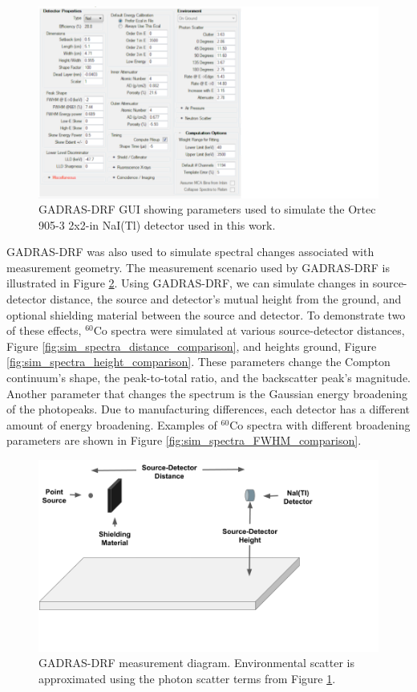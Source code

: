 \begin{figure}[H]
	\centering
	\includegraphics[trim=0 0 390 0,clip,width=0.7\linewidth]{images/gadras_parameters}
	\caption{GADRAS-DRF GUI showing parameters used to simulate the Ortec 905-3 2x2-in NaI(Tl) detector used in this work.}
	\label{fig:gadras_parameters}
\end{figure}


GADRAS-DRF was also used to simulate spectral changes associated with measurement geometry. The measurement scenario used by GADRAS-DRF is illustrated in Figure \ref{fig:gadras_measurement_setup}. Using GADRAS-DRF, we can simulate changes in source-detector distance, the source and detector's mutual height from the ground, and optional shielding material between the source and detector. To demonstrate two of these effects, $^{60}$Co spectra were simulated at various source-detector distances, Figure \ref{fig:sim_spectra_distance_comparison}, and heights ground, Figure \ref{fig:sim_spectra_height_comparison}. These parameters change the Compton continuum's shape, the peak-to-total ratio, and the backscatter peak's magnitude. Another parameter that changes the spectrum is the Gaussian energy broadening of the photopeaks. Due to manufacturing differences, each detector has a different amount of energy broadening. Examples of $^{60}$Co spectra with different broadening parameters are shown in Figure \ref{fig:sim_spectra_FWHM_comparison}.


\begin{figure}[H]
	\centering
	\includegraphics[trim=0 0 180 0,clip,width=0.9\linewidth]{images/gadras_measurement_setup}
	\caption{GADRAS-DRF measurement diagram. Environmental scatter is approximated using the photon scatter terms from Figure \ref{fig:gadras_parameters}.}
	\label{fig:gadras_measurement_setup}
\end{figure}



